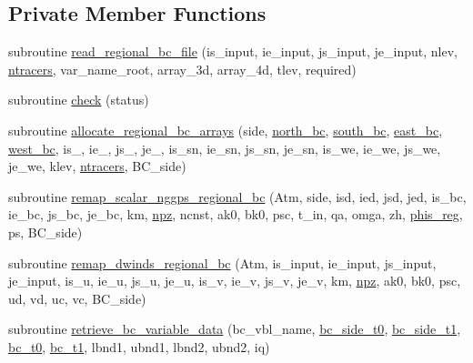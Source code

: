 \subsection*{Private Member Functions}
\begin{DoxyCompactItemize}
\item 
subroutine \hyperlink{classfv__regional__mod_a3fbfeacb423408193cbcd776f006f1f3}{read\-\_\-regional\-\_\-bc\-\_\-file} (is\-\_\-input, ie\-\_\-input, js\-\_\-input, je\-\_\-input, nlev, \hyperlink{classfv__regional__mod_a59026f4c5f7fbd69bbaf1c53c9418817}{ntracers}, var\-\_\-name\-\_\-root, array\-\_\-3d, array\-\_\-4d, tlev, required)
\item 
subroutine \hyperlink{classfv__regional__mod_aab40ff3a15b7e77a4333f55640fac1bd}{check} (status)
\item 
subroutine \hyperlink{classfv__regional__mod_af9430d75f6a57684138a27c6ef3a8dcc}{allocate\-\_\-regional\-\_\-bc\-\_\-arrays} (side, \hyperlink{classfv__regional__mod_ab0d18e800d03af2331630c5d41f24647}{north\-\_\-bc}, \hyperlink{classfv__regional__mod_aa19455811e08a60979cfe82e9339cf79}{south\-\_\-bc}, \hyperlink{classfv__regional__mod_abba04d13f69846096203d294e6224476}{east\-\_\-bc}, \hyperlink{classfv__regional__mod_acb6bcb04c44ff52d6d5caa07da7952d2}{west\-\_\-bc}, is\-\_, ie\-\_, js\-\_, je\-\_, is\-\_\-sn, ie\-\_\-sn, js\-\_\-sn, je\-\_\-sn, is\-\_\-we, ie\-\_\-we, js\-\_\-we, je\-\_\-we, klev, \hyperlink{classfv__regional__mod_a59026f4c5f7fbd69bbaf1c53c9418817}{ntracers}, B\-C\-\_\-side)
\item 
subroutine \hyperlink{classfv__regional__mod_abae4545097ec695c285252297c301e02}{remap\-\_\-scalar\-\_\-nggps\-\_\-regional\-\_\-bc} (Atm, side, isd, ied, jsd, jed, is\-\_\-bc, ie\-\_\-bc, js\-\_\-bc, je\-\_\-bc, km, \hyperlink{classfv__regional__mod_a66c4d15d316eeb5577275a92f68c14c1}{npz}, ncnst, ak0, bk0, psc, t\-\_\-in, qa, omga, zh, \hyperlink{classfv__regional__mod_a4360b9bea440884168e896f8c5ce3a4c}{phis\-\_\-reg}, ps, B\-C\-\_\-side)
\item 
subroutine \hyperlink{classfv__regional__mod_ad5354af17f3f7ee5e2b0b535cbfda5c7}{remap\-\_\-dwinds\-\_\-regional\-\_\-bc} (Atm, is\-\_\-input, ie\-\_\-input, js\-\_\-input, je\-\_\-input, is\-\_\-u, ie\-\_\-u, js\-\_\-u, je\-\_\-u, is\-\_\-v, ie\-\_\-v, js\-\_\-v, je\-\_\-v, km, \hyperlink{classfv__regional__mod_a66c4d15d316eeb5577275a92f68c14c1}{npz}, ak0, bk0, psc, ud, vd, uc, vc, B\-C\-\_\-side)
\item 
subroutine \hyperlink{classfv__regional__mod_a75315aba17f1dca9ddf4803a5c48c0a7}{retrieve\-\_\-bc\-\_\-variable\-\_\-data} (bc\-\_\-vbl\-\_\-name, \hyperlink{classfv__regional__mod_a152d9905d14d20d277c4fddf7a5fbc52}{bc\-\_\-side\-\_\-t0}, \hyperlink{classfv__regional__mod_a8ffee600e05a0988addd6e7387fe9547}{bc\-\_\-side\-\_\-t1}, \hyperlink{classfv__regional__mod_aa378b52fed4e1ce5559f939a10e55a1c}{bc\-\_\-t0}, \hyperlink{classfv__regional__mod_acac95ec214236b8e748460a0132f03bc}{bc\-\_\-t1}, lbnd1, ubnd1, lbnd2, ubnd2, iq)

\end{DoxyCompactItemize}
